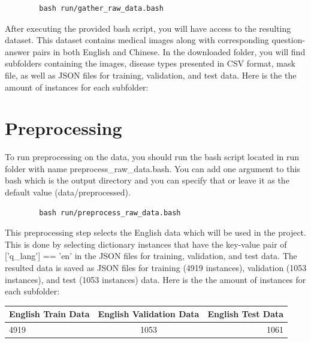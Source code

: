 \documentclass{adonis}
\begin{document}
        \begin{verbatim}
        bash run/gather_raw_data.bash
        \end{verbatim}

        
  After executing the provided bash script, you will have access to the resulting dataset.  This dataset contains medical images along with corresponding question-answer pairs in both English and Chinese. In the downloaded folder, you will find subfolders containing the images, disease types presented in CSV format, mask file, as well as JSON files for training, validation, and test data. Here is the the amount of instances for each subfolder:



		
		\section{Preprocessing}
	
        To run preprocessing on the data, you should run the bash script located in run folder with name preprocess\_raw\_data.bash. You can add one argument to this bash which is the output directory and you can specify that or leave it as the default value (data/preprocessed).
        \begin{verbatim}
        bash run/preprocess_raw_data.bash
        \end{verbatim}

        
  This preprocessing step selects the English data which will be used in the project. This is done by selecting dictionary instances that have the key-value pair of ['q\_lang'] == 'en' in the JSON files for training, validation, and test data. The resulted data is saved as JSON files for training (4919 instances), validation (1053 instances), and test (1053 instances) data. Here is the the amount of instances for each subfolder:

   \begin{table}[H]
  \centering
  \setlength{\tabcolsep}{1.5em}
  {\renewcommand{\arraystretch}{1.2}
    \begin{minipage}{15.5cm}
  \begin{tabular}{ | l | c | r | }
    \hline
    English Train Data & English Validation Data & English Test Data \\ \hline
    4919 & 1053 & 1061 \\ \hline
  \end{tabular}
  \end{minipage}}
  \end{table}
\end{document}

